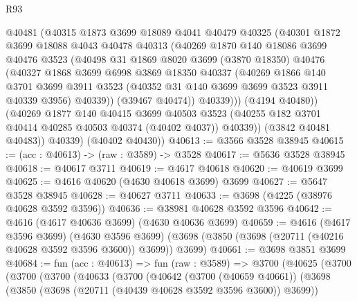 \begin{lexlean}{R93}
\begin{coremodule}
              @40481
              (@40315
                @1873
                @3699
                @18089
                @4041
                @40479
                @40325
                (@40301
                  @1872
                  @3699
                  @18088
                  @4043
                  @40478
                  @40313
                  (@40269
                    @1870
                    @140
                    @18086
                    @3699
                    @40476
                    @3523
                    (@40498
                      @31
                      @1869
                      @8020
                      @3699
                      (@3870 @18350)
                      @40476
                      (@40327
                        @1868
                        @3699
                        @6998
                        @3869
                        @18350
                        @40337
                        (@40269
                          @1866
                          @140
                          @3701
                          @3699
                          @3911
                          @3523
                          (@40352 @31 @140 @3699 @3699 @3523 @3911 @40339 @3956)
                          @40339))
                      (@39467 @40474))
                    @40339)))
              (@4194 @40480))
            (@40269
              @1877
              @140
              @40415
              @3699
              @40503
              @3523
              (@40255 @182 @3701 @40414 @40285 @40503 @40374 (@40402 @4037))
              @40339))
          (@3842 @40481 @40483))
        @40339)
      (@40402 @40430))
@40613 := @3566 @3528 @38945
@40615 := (acc : @40613) -> (raw : @3589) -> @3528
@40617 := @5636 @3528 @38945
@40618 := @40617 @3711
@40619 := @4617 @40618
@40620 := @40619 @3699
@40625 := @4616 @40620 (@4630 @40618 @3699) @3699
@40627 := @5647 @3528 @38945
@40628 := @40627 @3711
@40633 := @3698 (@4225 (@38976 @40628 @3592 @3596))
@40636 := @38981 @40628 @3592 @3596
@40642 := @4616 (@4617 @40636 @3699) (@4630 @40636 @3699)
@40659 := @4616
    (@4617 @3596 @3699)
    (@4630 @3596 @3699)
    (@3698 (@3850 (@3698 (@20711 (@40216 @40628 @3592 @3596 @3600)) @3699)) @3699)
@40661 := @3698 @3851 @3699
@40684 := fun (acc : @40613) =>
  fun (raw : @3589) =>
  @3700
    (@40625
      (@3700
        (@3700
          (@3700
            (@40633
              (@3700
                (@40642
                  (@3700 (@40659 @40661))
                  (@3698
                    (@3850 (@3698 (@20711 (@40439 @40628 @3592 @3596 @3600)) @3699))

\end{coremodule}
\end{lexlean}
